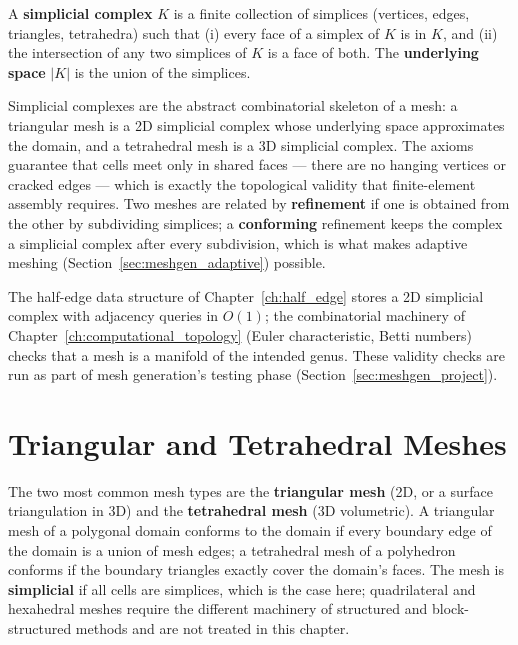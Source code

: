 \begin{definition}\label{def:meshgen_simplicial_complex}
  A \textbf{simplicial complex} $K$ is a finite collection of simplices
  (vertices, edges, triangles, tetrahedra) such that (i) every face of a
  simplex of $K$ is in $K$, and (ii) the intersection of any two simplices
  of $K$ is a face of both. The \textbf{underlying space} $|K|$ is the
  union of the simplices.
\end{definition}

Simplicial complexes are the abstract combinatorial skeleton of a mesh: a
triangular mesh is a 2D simplicial complex whose underlying space
approximates the domain, and a tetrahedral mesh is a 3D simplicial complex.
The axioms guarantee that cells meet only in shared faces --- there are no
hanging vertices or cracked edges --- which is exactly the topological
validity that finite-element assembly requires. Two meshes are related by
\textbf{refinement} if one is obtained from the other by subdividing
simplices; a \textbf{conforming} refinement keeps the complex a
simplicial complex after every subdivision, which is what makes adaptive
meshing (Section~\ref{sec:meshgen_adaptive}) possible.

The half-edge data structure of Chapter~\ref{ch:half_edge} stores a 2D
simplicial complex with adjacency queries in $O(1)$; the combinatorial
machinery of Chapter~\ref{ch:computational_topology} (Euler characteristic,
Betti numbers) checks that a mesh is a manifold of the intended genus.
These validity checks are run as part of mesh generation's testing phase
(Section~\ref{sec:meshgen_project}).


\section{Triangular and Tetrahedral Meshes}
\label{sec:meshgen_tri_tet}

The two most common mesh types are the \textbf{triangular mesh} (2D, or a
surface triangulation in 3D) and the \textbf{tetrahedral mesh} (3D
volumetric). A triangular mesh of a polygonal domain conforms to the domain
if every boundary edge of the domain is a union of mesh edges; a
tetrahedral mesh of a polyhedron conforms if the boundary triangles exactly
cover the domain's faces. The mesh is \textbf{simplicial} if all cells are
simplices, which is the case here; quadrilateral and hexahedral meshes
require the different machinery of structured and block-structured methods
and are not treated in this chapter.

